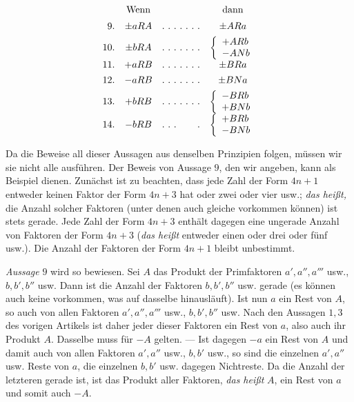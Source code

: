 \[
\begin{array}{rccc}&\text{Wenn}&&\text{dann}\\[5pt]
9.&\pm aRA&\mathinner{.\ .\ .\ .\ .\ .\ .}&\pm ARa\\[4pt]
10.&\pm bRA&\mathinner{.\ .\ .\ .\ .\ .\ .}&\left\{\begin{array}{l}+ARb\\-ANb\end{array}\right.\\[4pt]
11.&+aRB&\mathinner{.\ .\ .\ .\ .\ .\ .}&\pm BRa\\[4pt]
12.&-aRB&\mathinner{.\ .\ .\ .\ .\ .\ .}&\pm BNa\\[4pt]
13.&+bRB&\mathinner{.\ .\ .\ .\ .\ .\ .}&\left\{\begin{array}{l}-BRb\\+BNb\end{array}\right.\\[4pt]
14.&-bRB&\mathinner{.\ .\ .\ \phantom{.\ .\ .}\ .}&\left\{\begin{array}{l}+BRb\\-BNb\end{array}\right.\\[4pt]
\end{array}
\]

Da die Beweise all dieser Aussagen aus denselben Prinzipien folgen, müssen wir sie nicht alle ausführen. Der Beweis von Aussage $9$, den wir angeben, kann als Beispiel dienen. Zunächst ist zu beachten, dass jede Zahl der Form $4n+1$ entweder keinen Faktor der Form $4n+3$ hat oder zwei oder vier usw.; \emph{das heißt,} die Anzahl solcher Faktoren (unter denen auch gleiche vorkommen können) ist stets gerade. Jede Zahl der Form $4n+3$ enthält dagegen eine ungerade Anzahl von Faktoren der Form $4n+3$ (\emph{das heißt} entweder einen oder drei oder fünf usw.). Die Anzahl der Faktoren der Form $4n+1$ bleibt unbestimmt.

\emph{Aussage} $9$ wird so bewiesen. Sei $A$ das Produkt der Primfaktoren $a',a'',a'''$ usw., $b,b',b''$ usw. Dann ist die Anzahl der Faktoren $b,b',b''$ usw. gerade (es können auch keine vorkommen, was auf dasselbe hinausläuft). Ist nun $a$ ein Rest von $A$, so auch von allen Faktoren $a',a'',a'''$ usw., $b,b',b''$ usw. Nach den Aussagen $1,3$ des vorigen Artikels ist daher jeder dieser Faktoren ein Rest von $a$, also auch ihr Produkt $A$. Dasselbe muss für $-A$ gelten. --- Ist dagegen $-a$ ein Rest von $A$ und damit auch von allen Faktoren $a',a''$ usw., $b,b'$ usw., so sind die einzelnen $a',a''$ usw. Reste von $a$, die einzelnen $b,b'$ usw. dagegen Nichtreste. Da die Anzahl der letzteren gerade ist, ist das Produkt aller Faktoren, \emph{das heißt} $A$, ein Rest von $a$ und somit auch $-A$.


